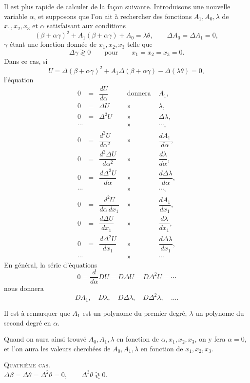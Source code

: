 \documentclass[11pt]{article}
\begin{document}
Il est plus rapide de calculer de la façon suivante. Introduisons une nouvelle variable $\alpha$, et supposons que l’on ait à rechercher des fonctions $A_1,A_0,\lambda$ de $x_1,x_2,x_3$ et $\alpha$ satisfaisant aux conditions
\[
(\beta+\alpha\gamma)^2+A_1(\beta+\alpha\gamma)+A_0=\lambda\theta,
\qquad
\Delta A_0=\Delta A_1=0,
\]
$\gamma$ étant une fonction donnée de $x_1,x_2,x_3$ telle que
\[
\Delta\gamma\gtrless0\qquad \text{pour}\qquad x_1=x_2=x_3=0.
\]
Dans ce cas, si
\[
U=\Delta(\beta+\alpha\gamma)^2+A_1\Delta(\beta+\alpha\gamma)-\Delta(\lambda\theta)=0,
\]
l’équation
\[
\begin{array}{rclcl}
0&=&\dfrac{dU}{d\alpha}&\text{ donnera }&A_1,\\[0.2em]
0&=&\Delta U&\text{ » }&\lambda,\\
0&=&\Delta^2 U&\text{ » }&\Delta\lambda,\\
\cdots&&&\text{ » }&\cdots,\\[0.2em]
0&=&\dfrac{d^2U}{d\alpha^2}&\text{ » }&\dfrac{dA_1}{d\alpha},\\[0.2em]
0&=&\dfrac{d^2\Delta U}{d\alpha^2}&\text{ » }&\dfrac{d\lambda}{d\alpha},\\[0.2em]
0&=&\dfrac{d\Delta^2 U}{d\alpha}&\text{ » }&\dfrac{d\Delta\lambda}{d\alpha},\\
\cdots&&&\text{ » }&\cdots,\\[0.2em]
0&=&\dfrac{d^2U}{d\alpha\,dx_1}&\text{ » }&\dfrac{dA_1}{dx_1},\\[0.2em]
0&=&\dfrac{d\Delta U}{dx_1}&\text{ » }&\dfrac{d\lambda}{dx_1},\\[0.2em]
0&=&\dfrac{d\Delta^2 U}{dx_1}&\text{ » }&\dfrac{d\Delta\lambda}{dx_1},\\
\cdots&&&\text{ » }&\cdots
\end{array}
\]
En général, la série d’équations
\[
0=\frac{d}{d\alpha}DU=D\Delta U=D\Delta^2U=\cdots
\]
nous donnera
\[
DA_1,\quad D\lambda,\quad D\Delta\lambda,\quad D\Delta^2\lambda,\quad \ldots.
\]

Il est à remarquer que $A_1$ est un polynome du premier degré, $\lambda$ un polynome du second degré en $\alpha$.

Quand on aura ainsi trouvé $A_0,A_1,\lambda$ en fonction de $\alpha,x_1,x_2,x_3$, on y fera $\alpha=0$, et l’on aura les valeurs cherchées de $A_0,A_1,\lambda$ en fonction de $x_1,x_2,x_3$.

\begin{center}
{\scshape Quatrième cas.}\\[0.3em]
$\Delta\beta=\Delta\theta=\Delta^2\theta=0,\qquad \Delta^3\theta\gtrless0.$
\end{center}
\end{document}
